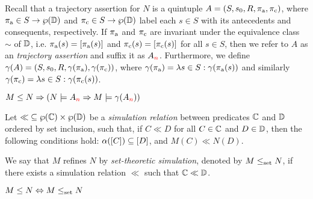 
Recall that a trajectory assertion for $N$ is a quintuple $A = (S, s_{0}, R, \operatorname{\pi_{\textrm{a}}}, \operatorname{\pi_{\textrm{c}}})$, where $\operatorname{\pi_{\textrm{a}}} \in S \rightarrow \wp(\mathbb{D})$ and $\operatorname{\pi_{\textrm{c}}} \in S \rightarrow \wp(\mathbb{D})$ label each $s \in S$ with its antecedents and consequents, respectively. If $\operatorname{\pi_{\textrm{a}}}$ and $\operatorname{\pi_{\textrm{c}}}$ are invariant under the equivalence class $\sim$ of $\mathbb{D}$, i.e. $\operatorname{\pi_{\textrm{a}}}(s) = [\operatorname{\pi_{\textrm{a}}}(s)]$ and $\operatorname{\pi_{\textrm{c}}}(s) = [\operatorname{\pi_{\textrm{c}}}(s)]$ for all $s \in S$, then we refer to $A$ as an \textit{ trajectory assertion} and suffix it as $A_{\textcolor{red}{n}}$. Furthermore, we define $\gamma(A) = (S, s_{0}, R, \gamma(\operatorname{\pi_{\textrm{a}}}), \gamma(\operatorname{\pi_{\textrm{c}}}))$, where $\gamma(\operatorname{\pi_{\textrm{a}}}) = \lambda s \in S : \gamma(\operatorname{\pi_{\textrm{a}}}(s))$ and similarly $\gamma(\operatorname{\pi_{\textrm{c}}}) = \lambda s \in S : \gamma(\operatorname{\pi_{\textrm{c}}}(s))$.
%
\begin{theorem} \label{thm:traj-refines}
$M \leq N \Rightarrow (N \models A_{\textcolor{red}{n}} \Rightarrow M \models \gamma(A_{\textcolor{red}{n}}))$
\end{theorem}

Let ${\ll} \subseteq \wp(\mathbb{C}) \times \wp(\mathbb{D})$ be a \textit{simulation relation} between predicates $\mathbb{C}$ and $\mathbb{D}$ ordered by set inclusion, such that, if $C \ll D$ for all $C \in \mathbb{C}$ and $D \in \mathbb{D}$, then the following conditions hold: $\alpha([C]) \subseteq [D]$, and $M(C) \ll N(D)$.

We say that $M$ refines $N$ by \textit{set-theoretic simulation}, denoted by $M \leq_{\textrm{set}} N$, if there exists a simulation relation $\ll$ such that $\mathbb{C} \ll \mathbb{D}$.
%
\begin{theorem} \label{thm:traj-equal-set}
$M \leq N \Leftrightarrow M \leq_{\textrm{set}} N$
\end{theorem}


